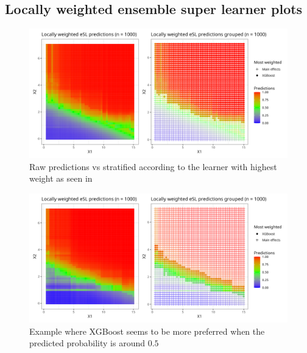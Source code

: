 \documentclass[11pt, a4paper]{article}
\theoremstyle{definition}
\theoremstyle{remark}
\begin{document}
\subsection{Locally weighted ensemble super learner plots}
\begin{figure}[H]
    \centering
    \centerline{\includegraphics[width=1.2\textwidth]{figures/esl_preds_lw_stratified_tiled.png}}
    \caption{Raw predictions vs stratified according to the learner with highest weight as seen in }
    \label{fig:esl_preds_lw_stratified_tiled}
\end{figure}
 
\begin{figure}[H]
    \centering
    \centerline{\includegraphics[width=1.2\textwidth]{figures/esl_preds_lw_stratified_tiled2.png}}
    \caption{Example where XGBoost seems to be more preferred when the predicted probability is around $ 0.5 $}
    \label{fig:esl_preds_lw_stratified_tiled2}
\end{figure}
\end{document}
